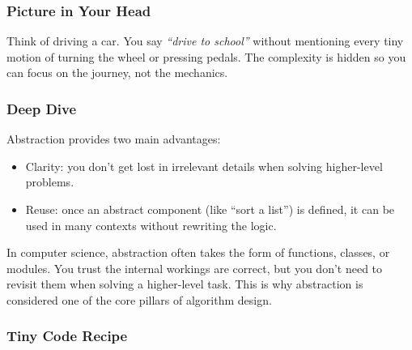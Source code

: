 \documentclass[
  letterpaper,
  DIV=11,
  numbers=noendperiod]{scrreprt}
\providecommand{\tightlist}{%
  \setlength{\itemsep}{0pt}\setlength{\parskip}{0pt}}
\begin{document}
\subsubsection{Picture in Your Head}\label{picture-in-your-head-40}

Think of driving a car. You say \emph{``drive to school''} without
mentioning every tiny motion of turning the wheel or pressing pedals.
The complexity is hidden so you can focus on the journey, not the
mechanics.

\subsubsection{Deep Dive}\label{deep-dive-10}

Abstraction provides two main advantages:

\begin{itemize}
\tightlist
\item
  Clarity: you don't get lost in irrelevant details when solving
  higher-level problems.
\item
  Reuse: once an abstract component (like ``sort a list'') is defined,
  it can be used in many contexts without rewriting the logic.
\end{itemize}

In computer science, abstraction often takes the form of functions,
classes, or modules. You trust the internal workings are correct, but
you don't need to revisit them when solving a higher-level task. This is
why abstraction is considered one of the core pillars of algorithm
design.

\subsubsection{Tiny Code Recipe}\label{tiny-code-recipe-38}
\end{document}
